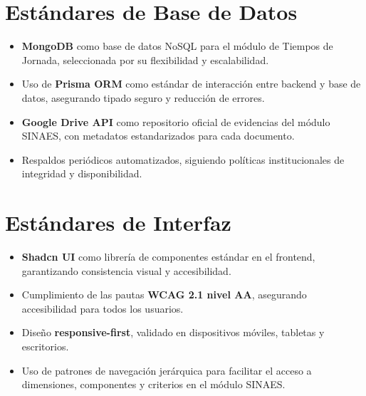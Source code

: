 \section{Estándares de Base de Datos}
\begin{itemize}
    \item \textbf{MongoDB} como base de datos NoSQL para el módulo de Tiempos de Jornada, seleccionada por su flexibilidad y escalabilidad.
    \item Uso de \textbf{Prisma ORM} como estándar de interacción entre backend y base de datos, asegurando tipado seguro y reducción de errores.
    \item \textbf{Google Drive API} como repositorio oficial de evidencias del módulo SINAES, con metadatos estandarizados para cada documento.
    \item Respaldos periódicos automatizados, siguiendo políticas institucionales de integridad y disponibilidad.
\end{itemize}

\section{Estándares de Interfaz}
\begin{itemize}
    \item \textbf{Shadcn UI} como librería de componentes estándar en el frontend, garantizando consistencia visual y accesibilidad.
    \item Cumplimiento de las pautas \textbf{WCAG 2.1 nivel AA}, asegurando accesibilidad para todos los usuarios.
    \item Diseño \textbf{responsive-first}, validado en dispositivos móviles, tabletas y escritorios.
    \item Uso de patrones de navegación jerárquica para facilitar el acceso a dimensiones, componentes y criterios en el módulo SINAES.
\end{itemize}
